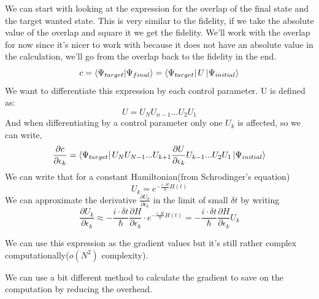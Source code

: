 \documentclass[english, a4paper, 12pt, twoside]{article}
\numberwithin{equation}{section} %
\begin{document}
We can start with looking at the expression for the overlap of the final state and the target wanted state. This is very similar to the fidelity, if we take the absolute value of the overlap and square it we get the fidelity. We'll work with the overlap for now since it's nicer to work with because it does not have an absolute value in the calculation, we'll go from the overlap back to the fidelity in the end.
\begin{equation} \label{def:overlap}
c = \braket{\Psi_{target}}{\Psi_{final}} = \bra{\Psi_{target}}U\ket{\Psi_{initial}}
\end{equation}
We want to differentiate this expression by each control parameter. U is defined as:
\[ U = U_N U_{n-1}...U_2 U_1 \]
And when differentiating by a control parameter only one $U_k$ is affected, so we can write,
\[
\frac{\partial c}{\partial \epsilon_k} = \bra{\Psi_{target}}U_N U_{N-1} ... U_{k+1}\frac{\partial U}{\partial \epsilon_k} U_{k-1} ...U_2 U_1\ket{\Psi_{initial}} 
\]
We can write that for a constant Hamiltonian(from Schrodinger's equation)
\[
    U_k = e^{-\frac{i\cdot \delta t}{\hbar}H(t)}
\]
We can approximate the derivative $\frac{\partial U_k}{\partial \epsilon_k}$ in the limit of small $\delta t$ by writing
\begin{equation*}
    \frac{\partial U_k}{\partial \epsilon_k} \approx -\frac{i\cdot \delta t}{\hbar}\frac{\partial H}{\partial \epsilon_k} \cdot e^{-\frac{i\cdot \delta t}{\hbar}H(t)} = -\frac{i\cdot \delta t}{\hbar}\frac{\partial H}{\partial \epsilon_k} U_k
\end{equation*}

We can use this expression as the gradient values but it's still rather complex computationally($o(N^2)$ complexity).\par
We can use a bit different method to calculate the gradient to save on the computation by reducing the overhead.
\end{document}
